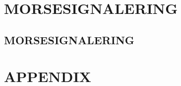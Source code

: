 \documentclass[a4paper,twoside,twocolumn,openright]{book}
\begin{document}
\part{MORSESIGNALERING}
\chapter{MORSESIGNALERING}



\appendix
\part{APPENDIX}













\listoffigures
\listoftables

\backmatter

\printindex
\end{document}

